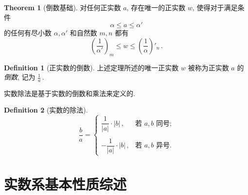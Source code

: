 \documentclass{book}
\newcommand{\abs}[1]{\left\lvert #1 \right\rvert}
\numberwithin{equation}{section}
\numberwithin{figure}{section}
\theoremstyle{definition}
\newtheorem{definition}{Definition}
\newtheorem{theorem}{Theorem}[section]
\begin{document}
\begin{theorem}[倒数基础]
  对任何正实数 $a$, 存在唯一的正实数 $w$, 使得对于满足条件
  \begin{equation*}
    \alpha\leqslant a\leqslant\alpha'
  \end{equation*}
  的任何有尽小数 $\alpha,\alpha'$ 和自然数 $m,n$ 都有
  \begin{equation*}
    \left( \frac{1}{\alpha'} \right)_m\leqslant w\leqslant \left( \frac{1}{\alpha} \right)'_n\,.
  \end{equation*}
\end{theorem}

\begin{definition}[正实数的倒数]
  上述定理所述的唯一正实数 $w$ 被称为正实数 $a$ 的\emph{倒数}, 记为 $\frac{1}{a}$\,.
\end{definition}

实数除法是基于实数的倒数和乘法来定义的.
\begin{definition}[实数的除法]
  \begin{equation*}
    \frac{b}{a}=
    \begin{cases}
      \dfrac{1}{\abs{a}}\cdot\abs{b}\,,&\text{若 $a,b$ 同号;}\\
      \\
      -\dfrac{1}{\abs{a}}\cdot\abs{b}\,,&\text{若 $a,b$ 异号.}
    \end{cases}
  \end{equation*}
\end{definition}

\section{实数系基本性质综述}
\end{document}
